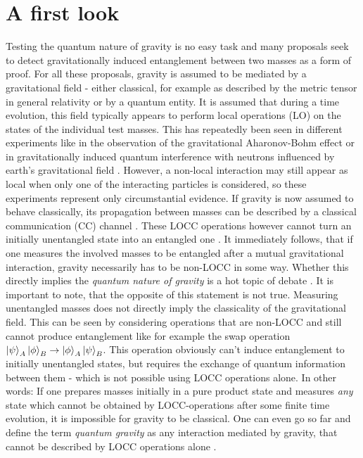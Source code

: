 \chapter{A first look}\label{cha:first-look}

Testing the quantum nature of gravity is no easy task and many proposals seek to detect gravitationally induced entanglement between two masses \cite{Marletto_2017,Krisnanda_2020,Chevalier_2020,Pedernales_2019,Bose_2017} as a form of proof. 
For all these proposals, gravity is assumed to be mediated by a gravitational field - either classical, for example as described by the metric tensor in general relativity or by a quantum entity.
It is assumed that during a time evolution, this field typically appears to perform local operations (LO) on the states of the individual test masses.
This has repeatedly been seen in different experiments like in the observation of the gravitational Aharonov-Bohm effect \cite{Overstreet_2022} or in gravitationally induced quantum interference with neutrons influenced by earth's gravitational field \cite{Colella_1975}.
However, a non-local interaction may still appear as local when only one of the interacting particles is considered, so these experiments represent only circumstantial evidence.
If gravity is now assumed to behave classically, its propagation between masses can be described by a classical communication (CC) channel \cite{Lami_2024}.
These LOCC operations however cannot turn an initially unentangled state into an entangled one \cite{Horodecki_2009, Plenio_2005a}.
It immediately follows, that if one measures the involved masses to be entangled after a mutual gravitational interaction, gravity necessarily has to be non-LOCC in some way.
Whether this directly implies the \textit{quantum nature of gravity} is a hot topic of debate \cite{Hall_2018, MartinMartinez_2023}.
It is important to note, that the opposite of this statement is not true. Measuring unentangled masses does not directly imply the classicality of the gravitational field.
This can be seen by considering operations that are non-LOCC and still cannot produce entanglement like for example the swap operation $\ket{\psi}_A\ket{\phi}_B \rightarrow \ket{\phi}_A\ket{\psi}_B$. This operation obviously can't induce entanglement to initially unentangled states, but requires the exchange of quantum information between them - which is not possible using LOCC operations alone.
In other words: If one prepares masses initially in a pure product state and measures \textit{any} state which cannot be obtained by LOCC-operations after some finite time evolution, it is impossible for gravity to be classical. One can even go so far and define the term \emph{quantum gravity} as any interaction mediated by gravity, that cannot be described by LOCC operations alone \cite{Lami_2024}.

